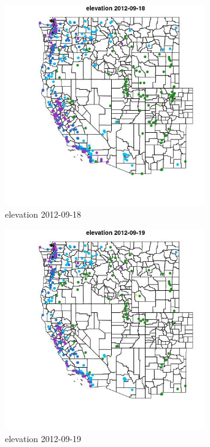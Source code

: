 \begin{figure} 
\centering  
\includegraphics[width=0.77\textwidth]{Code_Outputs/ML_input_report_ML_input_PM25_Step5_part_d_de_duplicated_aves_ML_input_MapObselevation2012-09-18.jpg} 
\caption{\label{fig:ML_input_report_ML_input_PM25_Step5_part_d_de_duplicated_aves_ML_inputMapObselevation2012-09-18}elevation 2012-09-18} 
\end{figure} 
 

\begin{figure} 
\centering  
\includegraphics[width=0.77\textwidth]{Code_Outputs/ML_input_report_ML_input_PM25_Step5_part_d_de_duplicated_aves_ML_input_MapObselevation2012-09-19.jpg} 
\caption{\label{fig:ML_input_report_ML_input_PM25_Step5_part_d_de_duplicated_aves_ML_inputMapObselevation2012-09-19}elevation 2012-09-19} 
\end{figure} 
 

